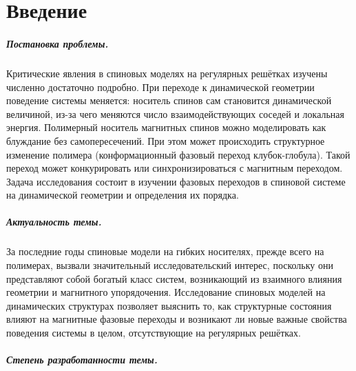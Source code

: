 \chapter*{Введение}                         %

 

\paragraph*{Постановка проблемы.}

Критические явления в спиновых моделях на регулярных решётках изучены численно  достаточно подробно. 
При переходе к динамической геометрии поведение системы меняется: носитель спинов сам становится динамической величиной, из-за чего меняются число взаимодействующих соседей и локальная энергия.
Полимерный носитель магнитных спинов можно моделировать как блуждание без самопересечений. 
При этом может происходить структурное изменение полимера (конформационный фазовый переход клубок-глобула). 
Такой переход может конкурировать или синхронизироваться с магнитным переходом. 
Задача  исследования состоит в изучении фазовых переходов в спиновой системе на динамической геометрии и определения их порядка. 



\paragraph*{Актуальность темы.}


За последние годы спиновые модели на гибких носителях, прежде всего на полимерах,  вызвали значительный исследовательский интерес, поскольку они представляют собой богатый класс систем, возникающий из взаимного влияния геометрии и магнитного упорядочения.
Исследование спиновых моделей на динамических структурах позволяет выяснить то, как структурные состояния влияют на магнитные фазовые переходы и возникают ли новые важные свойства поведения системы в целом, отсутствующие на регулярных решётках.


\paragraph*{Степень разработанности темы.}

